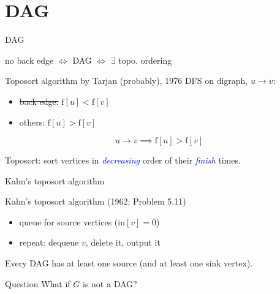 \section{DAG}

\begin{frame}{DAG}
  \begin{center}
    no back edge $\iff$ DAG \pause $\iff$ $\exists$ topo. ordering
  \end{center}

  \begin{block}{Toposort algorithm by Tarjan (probably), 1976}
    DFS on digraph, $u \to v$:
    \begin{itemize}
	  \item \sout{back edge:} $\text{f}[u] < \text{f}[v]$
      \item others: $\text{f}[u] > \text{f}[v]$
    \end{itemize}

	\pause
    \[ 
	  u \to v \implies \text{f}[u] > \text{f}[v]
	\]

	\pause
    \begin{center}
	  Toposort: sort vertices in \textcolor{blue}{\emph{decreasing}} order of their \textcolor{blue}{\emph{finish}} times.
    \end{center}
  \end{block}
\end{frame}
\begin{frame}{Kahn's toposort algorithm}
  \begin{exampleblock}{Kahn's toposort algorithm (1962; Problem 5.11) }
    \begin{itemize}
      \item queue for source vertices ($\text{in}[v] = 0$)
      \item repeat: dequeue $v$, delete it, output it
    \end{itemize}
  \end{exampleblock}

  \pause
  \begin{lemma}
	Every DAG has at least one source (and at least one sink vertex).
  \end{lemma}

  \pause
  \begin{alertblock}{Question}
	What if $G$ is not a DAG?
  \end{alertblock}
\end{frame}
